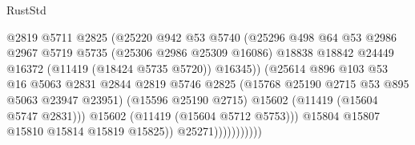 \begin{lexlean}{RustStd}
\begin{coremodule}
                                              @2819
                                              @5711
                                              @2825
                                              (@25220
                                                @942
                                                @53
                                                @5740
                                                (@25296
                                                  @498
                                                  @64
                                                  @53
                                                  @2986
                                                  @2967
                                                  @5719
                                                  @5735
                                                  (@25306 @2986 @25309 @16086)
                                                  @18838
                                                  @18842
                                                  @24449
                                                  @16372
                                                  (@11419 (@18424 @5735 @5720))
                                                  @16345))
                                              (@25614
                                                @896
                                                @103
                                                @53
                                                @16
                                                @5063
                                                @2831
                                                @2844
                                                @2819
                                                @5746
                                                @2825
                                                (@15768 @25190 @2715 @53 @895 @5063 @23947 @23951)
                                                (@15596 @25190 @2715)
                                                @15602
                                                (@11419 (@15604 @5747 @2831)))
                                              @15602
                                              (@11419 (@15604 @5712 @5753)))
                                            @15804
                                            @15807
                                            @15810
                                            @15814
                                            @15819
                                            @15825))
                                        @25271)))))))))))

\end{coremodule}
\end{lexlean}
